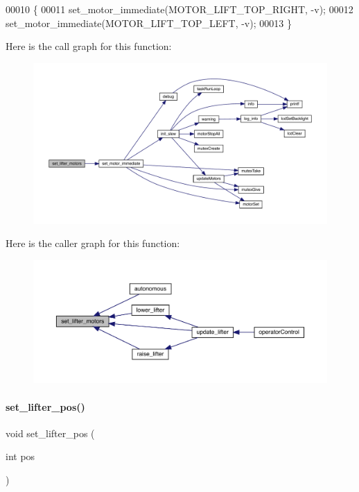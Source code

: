 \begin{DoxyCode}
00010                                     \{
00011   set_motor_immediate(MOTOR_LIFT_TOP_RIGHT, -v);
00012   set_motor_immediate(MOTOR_LIFT_TOP_LEFT, -v);
00013 \}
\end{DoxyCode}
Here is the call graph for this function\+:\nopagebreak
\begin{figure}[H]
\begin{center}
\leavevmode
\includegraphics[width=350pt]{lifter_8c_a2cfc188f60f945c824dd7fe7b0b5f4e4_cgraph}
\end{center}
\end{figure}
Here is the caller graph for this function\+:\nopagebreak
\begin{figure}[H]
\begin{center}
\leavevmode
\includegraphics[width=350pt]{lifter_8c_a2cfc188f60f945c824dd7fe7b0b5f4e4_icgraph}
\end{center}
\end{figure}
\mbox{\label{lifter_8c_abddc7cb502e12fa277b627c90a45efb1}} 
\paragraph{set\+\_\+lifter\+\_\+pos()}
{\footnotesize\ttfamily void set\+\_\+lifter\+\_\+pos (\begin{DoxyParamCaption}\item[{int}]{pos }\end{DoxyParamCaption})}



